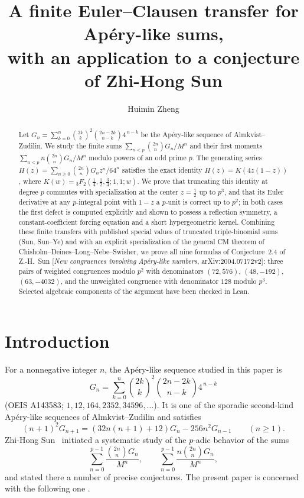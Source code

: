 \documentclass[11pt]{amsart}
\title[A finite Euler--Clausen transfer for Ap\'ery-like sums]{A finite Euler--Clausen transfer for Ap\'ery-like sums,\\ with an application to a conjecture of Zhi-Hong Sun}
\author{Huimin Zheng}
\theoremstyle{definition}
\theoremstyle{remark}
\begin{document}
\begin{abstract}
Let $G_n=\sum_{k=0}^n\binom{2k}{k}^2\binom{2n-2k}{n-k}4^{\,n-k}$ be the
Ap\'ery-like sequence of Almkvist--Zudilin. We study the finite sums
$\sum_{n<p}\binom{2n}{n}G_n/M^n$ and their first moments
$\sum_{n<p}n\binom{2n}{n}G_n/M^n$ modulo powers of an odd prime $p$.
The generating series
$H(z)=\sum_{n\ge0}\binom{2n}{n}G_nz^n/64^n$ satisfies the exact identity
$H(z)=K(4z(1-z))$, where
$K(w)={}_3F_2(\frac14,\frac12,\frac34;1,1;w)$.
We prove that truncating this identity at degree $p$ commutes with
specialization at the center $z=\frac12$ up to $p^3$, and that its
Euler derivative at any $p$-integral point with $1-z$ a $p$-unit is
correct up to $p^2$; in both cases the first defect is computed
explicitly and shown to possess a reflection symmetry, a
constant-coefficient forcing equation and a short hypergeometric kernel.
Combining these finite transfers with published special values of
truncated triple-binomial sums (Sun, Sun--Ye) and with an explicit
specialization of the general CM theorem of
Chisholm--Deines--Long--Nebe--Swisher, we prove all nine formulas of
Conjecture~2.4 of Z.-H.~Sun [\emph{New congruences involving
Ap\'ery-like numbers}, arXiv:2004.07172v2]: three pairs of weighted
congruences modulo $p^2$ with denominators
$(72,576)$, $(48,-192)$, $(63,-4032)$, and the unweighted congruence with
denominator $128$ modulo $p^3$.
Selected algebraic components of the argument have been checked in Lean.
\end{abstract}

\maketitle

\section{Introduction}

For a nonnegative integer $n$, the Ap\'ery-like sequence studied in this
paper is
\begin{equation}\label{eq:Gdef}
G_n=\sum_{k=0}^n\binom{2k}{k}^2\binom{2n-2k}{n-k}4^{\,n-k}
\end{equation}
(OEIS A143583; $1,12,164,2352,34596,\dots$). It is one of the sporadic
second-kind Ap\'ery-like sequences of Almkvist--Zudilin \cite{AZ} and
satisfies
\[
(n+1)^2G_{n+1}=(32n(n+1)+12)G_n-256n^2G_{n-1}\qquad(n\ge1).
\]
Zhi-Hong Sun~\cite{Sun24} initiated a systematic study of the
$p$-adic behavior of the sums
\begin{equation}\label{eq:sums}
\sum_{n=0}^{p-1}\frac{\binom{2n}{n}G_n}{M^n},
\qquad
\sum_{n=0}^{p-1}\frac{n\binom{2n}{n}G_n}{M^n},
\end{equation}
and stated there a number of precise conjectures. The present paper is
concerned with the following one \cite[Conjecture~2.4]{Sun24}.
\end{document}

